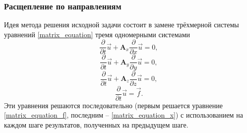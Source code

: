 \subsubsection{Расщепление по направлениям}
Идея метода \cite{fedorenko} решения исходной задачи состоит в замене трёхмерной системы
уравнений \ref{matrix_equation} тремя одномерными системами 
\begin{equation}
\frac{\partial}{\partial t}\vec u+\mathbf{A}_x \frac{\partial}{\partial x}\vec u
= 0,
\label{matrix_equation_x}
\end{equation}
\begin{equation}
\frac{\partial}{\partial t}\vec u+\mathbf{A}_y \frac{\partial}{\partial y}\vec u
= 0,
\label{matrix_equation_y}
\end{equation}
\begin{equation}
\frac{\partial}{\partial t}\vec u+\mathbf{A}_z \frac{\partial}{\partial z}\vec u
= 0,
\label{matrix_equation_z}
\end{equation}
\begin{equation}
\frac{\partial}{\partial t}\vec u = \vec f.
\label{matrix_equation_f}
\end{equation}
Эти уравнения решаются последовательно (первым решается уравнение
\ref{matrix_equation_f}, последним -- \ref{matrix_equation_x}) с использованием
на каждом шаге результатов, полученных на предыдущем шаге.
